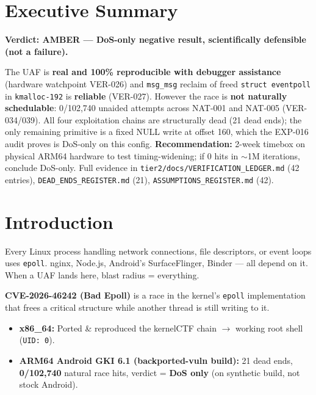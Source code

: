 \documentclass[11pt,a4paper]{article}
\begin{document}
\newpage

\section{Executive Summary}
\label{sec:executive}

\textbf{Verdict: AMBER — DoS-only negative result, scientifically defensible (not a failure).}

The UAF is \textbf{real and 100\% reproducible with debugger assistance} (hardware watchpoint VER-026) and \texttt{msg\_msg} reclaim of freed \texttt{struct eventpoll} in \texttt{kmalloc-192} is \textbf{reliable} (VER-027). However the race is \textbf{not naturally schedulable}: 0/102,740 unaided attempts across NAT-001 and NAT-005 (VER-034/039). All four exploitation chains are structurally dead (21 dead ends); the only remaining primitive is a fixed NULL write at offset 160, which the EXP-016 audit proves is DoS-only on this config. \textbf{Recommendation:} 2-week timebox on physical ARM64 hardware to test timing-widening; if 0 hits in $\sim$1M iterations, conclude DoS-only. Full evidence in \texttt{tier2/docs/VERIFICATION\_LEDGER.md} (42 entries), \texttt{DEAD\_ENDS\_REGISTER.md} (21), \texttt{ASSUMPTIONS\_REGISTER.md} (42).

\newpage

\section{Introduction}

Every Linux process handling network connections, file descriptors, or event loops uses \texttt{epoll}. nginx, Node.js, Android's SurfaceFlinger, Binder --- all depend on it. When a UAF lands here, blast radius = everything.

\textbf{CVE-2026-46242 (Bad Epoll)} is a race in the kernel's \texttt{epoll} implementation that frees a critical structure while another thread is still writing to it.

\begin{itemize}
  \item \textbf{x86\_64:} Ported \& reproduced the kernelCTF chain $\to$ working root shell (\texttt{UID: 0}).
  \item \textbf{ARM64 Android GKI 6.1 (backported-vuln build):} 21 dead ends, \textbf{0/102,740} natural race hits, verdict = \textbf{DoS only} (on synthetic build, not stock Android).
\end{itemize}
\end{document}
